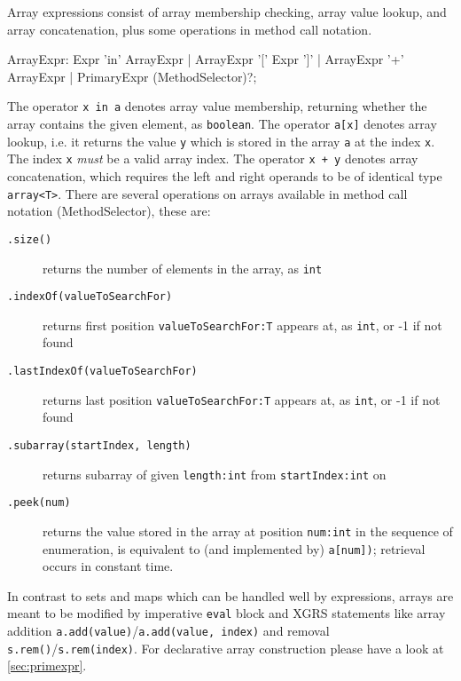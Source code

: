 Array expressions consist of array membership checking, array value lookup, and array concatenation, plus some operations in method call notation.

\begin{rail}
  ArrayExpr: Expr 'in' ArrayExpr | ArrayExpr '[' Expr ']' | ArrayExpr '+' ArrayExpr | PrimaryExpr (MethodSelector)?;
\end{rail}

The operator \texttt{x in a} denotes array value membership, returning whether the array contains the given element, as \texttt{boolean}.
The operator \texttt{a[x]} denotes array lookup, i.e. it returns the value \texttt{y} which is stored in the array \texttt{a} at the index \texttt{x}.
The index \texttt{x} \emph{must} be a valid array index.
The operator \texttt{x + y} denotes array concatenation, which requires the left and right operands to be of identical type \verb#array<T>#.
There are several operations on arrays available in method call notation (MethodSelector), these are:

\begin{description}
\item[\texttt{.size()}] returns the number of elements in the array, as \texttt{int}
\item[\texttt{.indexOf(valueToSearchFor)}] returns first position \texttt{valueToSearchFor:T} appears at, as \texttt{int}, or -1 if not found
\item[\texttt{.lastIndexOf(valueToSearchFor)}] returns last position \texttt{valueToSearchFor:T} appears at, as \texttt{int}, or -1 if not found
\item[\texttt{.subarray(startIndex, length)}] returns subarray of given \texttt{length:int} from \texttt{startIndex:int} on
\item[\texttt{.peek(num)}] returns the value stored in the array at position \texttt{num:int} in the sequence of enumeration, is equivalent to (and implemented by) \texttt{a[num])}; retrieval occurs in constant time.
\end{description}

\begin{note}
In contrast to sets and maps which can be handled well by expressions, arrays are meant to be modified by imperative \texttt{eval} block and XGRS statements like array addition \texttt{a.add(value)}/\texttt{a.add(value, index)} and removal \texttt{s.rem()}/\texttt{s.rem(index)}.
For declarative array construction please have a look at \ref{sec:primexpr}.
\end{note}


